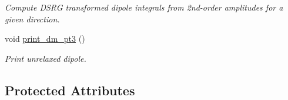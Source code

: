 \begin{DoxyCompactItemize}
\begin{DoxyCompactList}\small\item\em Compute D\+S\+RG transformed dipole integrals from 2nd-\/order amplitudes for a given direction. \end{DoxyCompactList}\item 
void \mbox{\hyperlink{classforte_1_1_d_s_r_g___m_r_p_t3_aa8d6ffbd67970a5b8711924b44d786aa}{print\+\_\+dm\+\_\+pt3}} ()
\begin{DoxyCompactList}\small\item\em Print unrelaxed dipole. \end{DoxyCompactList}\end{DoxyCompactItemize}
\subsection*{Protected Attributes}
